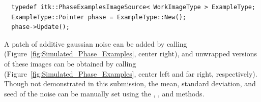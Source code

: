 \small
\begin{verbatim}
  typedef itk::PhaseExamplesImageSource< WorkImageType > ExampleType;
  ExampleType::Pointer phase = ExampleType::New();
  phase->Update();
\end{verbatim}
\normalsize

A patch of additive gaussian noise can be added by calling  (Figure~\ref{fig:Simulated_Phase_Examples}, center right), and unwrapped versions of these images can be obtained by calling  (Figure~\ref{fig:Simulated_Phase_Examples}, center left and far right, respectively).  Though not demonstrated in this submission, the mean, standard deviation, and seed of the noise can be manually set using the , , and  methods.
